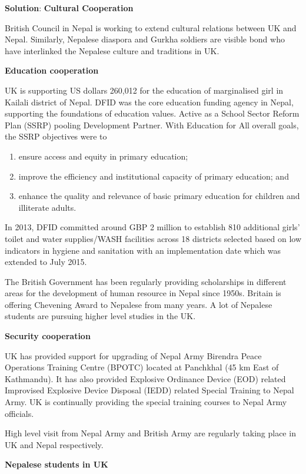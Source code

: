 \documentclass[
  openany]{book}
\newenvironment{solution}{ {\bfseries Solution}:}{}
\begin{document}
\begin{solution}
\textbf{Cultural Cooperation}

British Council in Nepal is working to extend cultural relations between UK and Nepal. Similarly, Nepalese diaspora and Gurkha soldiers are visible bond who have interlinked the Nepalese culture and traditions in UK.

\textbf{Education cooperation}

UK is supporting US dollars 260,012 for the education of marginalised girl in Kailali district of Nepal. DFID was the core education funding agency in Nepal, supporting the foundations of education values. Active as a School Sector Reform Plan (SSRP) pooling Development Partner. With Education for All overall goals, the SSRP objectives were to 
\begin{enumerate}
\item ensure access and equity in primary education; 
\item improve the efficiency and institutional capacity of primary education; and 
\item enhance the quality and relevance of basic primary education for children and illiterate adults.
\end{enumerate}

In 2013, DFID committed around GBP 2 million to establish 810 additional girls' toilet and water supplies/WASH facilities across 18 districts selected based on low indicators in hygiene and sanitation with an implementation date which was extended to July 2015.

The British Government has been regularly providing scholarships in different areas for the development of human resource in Nepal since 1950s. Britain is offering Chevening Award to Nepalese from many years. A lot of Nepalese students are pursuing higher level studies in the UK. 

\textbf{Security cooperation}

UK has provided support for upgrading of Nepal Army Birendra Peace Operations Training Centre (BPOTC) located at Panchkhal (45 km East of Kathmandu). It has also provided Explosive Ordinance Device (EOD) related Improvised Explosive Device Disposal (IEDD) related Special Training to Nepal Army. UK is continually providing the special training courses to Nepal Army officials.

High level visit from Nepal Army and British Army are regularly taking place in UK and Nepal respectively.

\textbf{Nepalese students in UK}

\end{solution}
\end{document}
